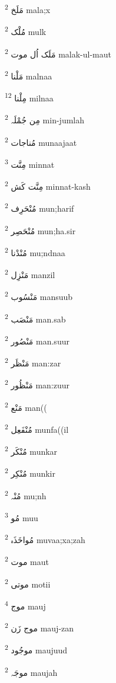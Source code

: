 \documentclass[12pt]{article}
\begin{document}
\begin{multicols}{5}
{\ur مَلَخ}   \textsuperscript{2} mala;x

{\ur مُلْک}   \textsuperscript{2} mulk

{\ur مَلَک اُل موت}   \textsuperscript{2} malak-ul-maut

{\ur مَلْنا}   \textsuperscript{2} malnaa

{\ur مِلْنا}   \textsuperscript{12} milnaa

{\ur مِن جُمْلَہ}   \textsuperscript{2} min-jumlah

{\ur مُناجات}   \textsuperscript{2} munaajaat

{\ur مِنَّت}   \textsuperscript{3} minnat

{\ur مِنَّت کَش}   \textsuperscript{2} minnat-kash

{\ur مُنْحَرِف}   \textsuperscript{2} mun;harif

{\ur مُنْحَصِر}   \textsuperscript{2} mun;ha.sir

{\ur مُنْدْنا}   \textsuperscript{2} mu;ndnaa

{\ur مَنْزِل}   \textsuperscript{2} manzil

{\ur مَنْسُوب}   \textsuperscript{2} mansuub

{\ur مَنْصَب}   \textsuperscript{2} man.sab

{\ur مَنْصُور}   \textsuperscript{2} man.suur

{\ur مَنْظَر}   \textsuperscript{2} man:zar

{\ur مَنْظُور}   \textsuperscript{2} man:zuur

{\ur مَنْع}   \textsuperscript{2} man((

{\ur مُنْفَعِل}   \textsuperscript{2} munfa((il

{\ur مُنْکَر}   \textsuperscript{2} munkar

{\ur مُنْکِر}   \textsuperscript{2} munkir

{\ur مُنْہ}   \textsuperscript{2} mu;nh

{\ur مُو}   \textsuperscript{3} muu

{\ur مُواخَذَہ}   \textsuperscript{2} muvaa;xa;zah

{\ur موت}   \textsuperscript{2} maut

{\ur موتی}   \textsuperscript{2} motii

{\ur موج}   \textsuperscript{4} mauj

{\ur موج زَن}   \textsuperscript{2} mauj-zan

{\ur موجُود}   \textsuperscript{2} maujuud

{\ur موجَہ}   \textsuperscript{2} maujah


\end{multicols}
\end{document}
